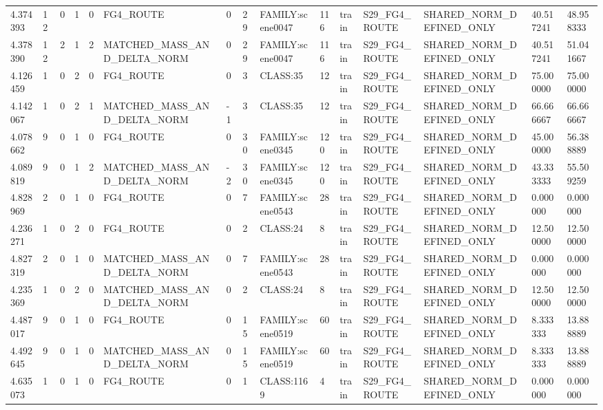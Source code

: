 \begin{tabular}{lllllllllllllll}
4.374393 & 12 & 0 & 1 & 0 & FG4\_ROUTE & 0 & 29 & FAMILY:scene0047 & 116 & train & S29\_FG4\_ROUTE & SHARED\_NORM\_DEFINED\_ONLY & 40.517241 & 48.958333 \\
4.378390 & 12 & 2 & 1 & 2 & MATCHED\_MASS\_AND\_DELTA\_NORM & 0 & 29 & FAMILY:scene0047 & 116 & train & S29\_FG4\_ROUTE & SHARED\_NORM\_DEFINED\_ONLY & 40.517241 & 51.041667 \\
4.126459 & 1 & 0 & 2 & 0 & FG4\_ROUTE & 0 & 3 & CLASS:35 & 12 & train & S29\_FG4\_ROUTE & SHARED\_NORM\_DEFINED\_ONLY & 75.000000 & 75.000000 \\
4.142067 & 1 & 0 & 2 & 1 & MATCHED\_MASS\_AND\_DELTA\_NORM & -1 & 3 & CLASS:35 & 12 & train & S29\_FG4\_ROUTE & SHARED\_NORM\_DEFINED\_ONLY & 66.666667 & 66.666667 \\
4.078662 & 9 & 0 & 1 & 0 & FG4\_ROUTE & 0 & 30 & FAMILY:scene0345 & 120 & train & S29\_FG4\_ROUTE & SHARED\_NORM\_DEFINED\_ONLY & 45.000000 & 56.388889 \\
4.089819 & 9 & 0 & 1 & 2 & MATCHED\_MASS\_AND\_DELTA\_NORM & -2 & 30 & FAMILY:scene0345 & 120 & train & S29\_FG4\_ROUTE & SHARED\_NORM\_DEFINED\_ONLY & 43.333333 & 55.509259 \\
4.828969 & 2 & 0 & 1 & 0 & FG4\_ROUTE & 0 & 7 & FAMILY:scene0543 & 28 & train & S29\_FG4\_ROUTE & SHARED\_NORM\_DEFINED\_ONLY & 0.000000 & 0.000000 \\
4.236271 & 1 & 0 & 2 & 0 & FG4\_ROUTE & 0 & 2 & CLASS:24 & 8 & train & S29\_FG4\_ROUTE & SHARED\_NORM\_DEFINED\_ONLY & 12.500000 & 12.500000 \\
4.827319 & 2 & 0 & 1 & 0 & MATCHED\_MASS\_AND\_DELTA\_NORM & 0 & 7 & FAMILY:scene0543 & 28 & train & S29\_FG4\_ROUTE & SHARED\_NORM\_DEFINED\_ONLY & 0.000000 & 0.000000 \\
4.235369 & 1 & 0 & 2 & 0 & MATCHED\_MASS\_AND\_DELTA\_NORM & 0 & 2 & CLASS:24 & 8 & train & S29\_FG4\_ROUTE & SHARED\_NORM\_DEFINED\_ONLY & 12.500000 & 12.500000 \\
4.487017 & 9 & 0 & 1 & 0 & FG4\_ROUTE & 0 & 15 & FAMILY:scene0519 & 60 & train & S29\_FG4\_ROUTE & SHARED\_NORM\_DEFINED\_ONLY & 8.333333 & 13.888889 \\
4.492645 & 9 & 0 & 1 & 0 & MATCHED\_MASS\_AND\_DELTA\_NORM & 0 & 15 & FAMILY:scene0519 & 60 & train & S29\_FG4\_ROUTE & SHARED\_NORM\_DEFINED\_ONLY & 8.333333 & 13.888889 \\
4.635073 & 1 & 0 & 1 & 0 & FG4\_ROUTE & 0 & 1 & CLASS:1169 & 4 & train & S29\_FG4\_ROUTE & SHARED\_NORM\_DEFINED\_ONLY & 0.000000 & 0.000000 \\

\end{tabular}
